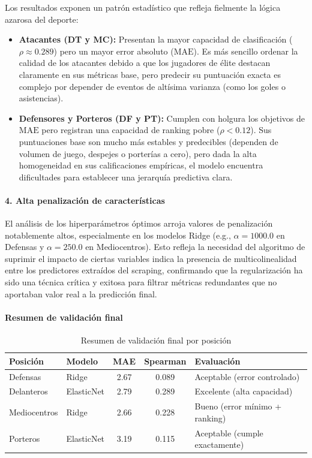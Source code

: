 Los resultados exponen un patrón estadístico que refleja fielmente la 
lógica azarosa del deporte:
\begin{itemize}
  \item \textbf{Atacantes (DT y MC):} Presentan la mayor capacidad de 
        clasificación ($\rho \approx 0.289$) pero un mayor error absoluto 
        ($\mathrm{MAE}$). Es más sencillo ordenar la calidad de los atacantes 
        debido a que los jugadores de élite destacan claramente en sus 
        métricas base, pero predecir su puntuación exacta es complejo por 
        depender de eventos de altísima varianza (como los goles o asistencias).
  \item \textbf{Defensores y Porteros (DF y PT):} Cumplen con holgura los 
        objetivos de $\mathrm{MAE}$ pero registran una capacidad de ranking pobre 
        ($\rho < 0.12$). Sus puntuaciones base son mucho más estables y predecibles 
        (dependen de volumen de juego, despejes o porterías a cero), pero dada 
        la alta homogeneidad en sus calificaciones empíricas, el modelo 
        encuentra dificultades para establecer una jerarquía predictiva clara.
\end{itemize}

\paragraph{4. Alta penalización de características}

El análisis de los hiperparámetros óptimos arroja valores de penalización 
notablemente altos, especialmente en los modelos Ridge (e.g., $\alpha=1000.0$ 
en Defensas y $\alpha=250.0$ en Mediocentros). Esto refleja la necesidad del algoritmo 
de suprimir el impacto de ciertas variables indica la presencia 
de multicolinealidad entre los predictores extraídos del scraping, confirmando 
que la regularización ha sido una técnica crítica y exitosa para filtrar métricas 
redundantes que no aportaban valor real a la predicción final.

\paragraph{Resumen de validación final}

\begin{table}[H]
\centering
\small
\begin{tabular}{|l|l|c|c|p{4cm}|}
\hline
\textbf{Posición} & \textbf{Modelo} & \textbf{MAE} & 
\textbf{Spearman} & \textbf{Evaluación} \\
\hline
Defensas & Ridge & 2.67 & 0.089 & Aceptable (error 
controlado) \\
Delanteros & ElasticNet & 2.79 & 0.289 & Excelente (alta 
capacidad) \\
Mediocentros & Ridge & 2.66 & 0.228 & Bueno (error mínimo + 
ranking) \\
Porteros & ElasticNet & 3.19 & 0.115 & Aceptable (cumple 
exactamente) \\
\hline
\end{tabular}
\caption{Resumen de validación final por posición}
\end{table}


